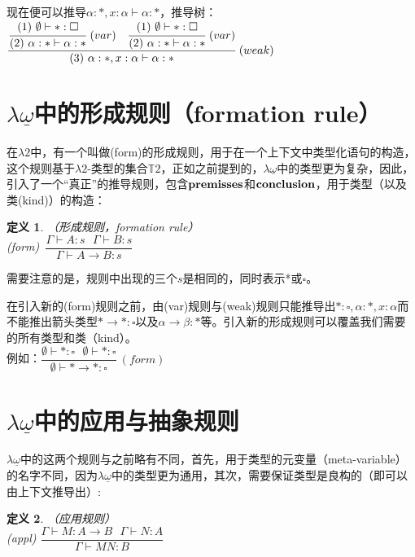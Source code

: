 \documentclass[UTF8]{article}
\newtheorem{thm}{定义}[section]
\begin{document}
		现在便可以推导$\alpha:*,x:\alpha\vdash\alpha:*$，推导树：\\
		
		$\cfrac{\cfrac{(1)\ \emptyset\vdash*:\square}{(2)\ \alpha:*\vdash\alpha:*}\ (var)\ \ \ \cfrac{(1)\ \emptyset\vdash*:\square}{(2)\ \alpha:*\vdash\alpha:*}\ (var)}{(3)\ \alpha:*,x:\alpha\vdash\alpha:*}\ (weak)$
		
	\section{$\lambda{\underline{\omega}}$中的形成规则（formation rule）}
		在$\lambda{2}$中，有一个叫做(form)的形成规则，用于在一个上下文中类型化语句的构造，这个规则基于$\lambda{2}$-类型的集合$\mathbb{T}2$，正如之前提到的，$\lambda{\underline{\omega}}$中的类型更为复杂，因此，引入了一个“真正”的推导规则，包含$\bf premisses$和$\bf conclusion$，用于类型（以及类(kind)）的构造：
		
		\begin{thm}（形成规则，formation rule）\\
			
			(form)\ $\dfrac{\Gamma\vdash A:s\ \ \ \Gamma\vdash B:s}{\Gamma\vdash A\rightarrow B:s}$
		\end{thm}
		
		需要注意的是，规则中出现的三个$s$是相同的，同时表示*或$\square$。
		
		在引入新的(form)规则之前，由(var)规则与(weak)规则只能推导出$*:\square,\alpha:*,x:\alpha$而不能推出箭头类型$*\rightarrow*:\square$以及$\alpha\rightarrow\beta:*$等。引入新的形成规则可以覆盖我们需要的所有类型和类（kind）。\\
		
		例如：$\dfrac{\emptyset\vdash*:\square\ \ \ \emptyset\vdash*:\square}{\emptyset\vdash*\rightarrow*:\square}\ (form)$
		
	\section{$\lambda{\underline{\omega}}$中的应用与抽象规则}
		$\lambda{\underline{\omega}}$中的这两个规则与之前略有不同，首先，用于类型的元变量（meta-variable）的名字不同，因为$\lambda{\underline{\omega}}$中的类型更为通用，其次，需要保证类型是良构的（即可以由上下文推导出）:
		
		\begin{thm}（应用规则）\\
			
			(appl) $\dfrac{\Gamma\vdash M:A\rightarrow B\ \ \ \Gamma\vdash N:A}{\Gamma\vdash MN:B}$
		\end{thm}
	
\end{document}
